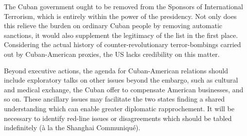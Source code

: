 \documentclass[letterpaper,12pt,twoside]{article} %
\begin{document}
\begin{multicols}{2}
The Cuban government ought to be removed from the Sponsors of International Terrorism, which is entirely within the power of the presidency. Not only does this relieve the burden on ordinary Cuban people by removing automatic sanctions, it would also supplement the legitimacy of the list in the first place. Considering the actual history of counter-revolutionary terror-bombings carried out by Cuban-American proxies, the US lacks credibility on this matter.

Beyond executive actions, the agenda for Cuban-American relations should include exploratory talks on other issues beyond the embargo, such as cultural and medical exchange, the Cuban offer to compensate American businesses, and so on. These ancillary issues may facilitate the two states finding a shared understanding which can enable greater diplomatic rapprochement. It will be necessary to identify red-line issues or disagreements which should be tabled indefinitely (à la the Shanghai Communiqué).

\end{multicols}
  \vfill
  \pagebreak


\printbibliography[heading=bibintoc,title=Bibliography]


\end{document}
